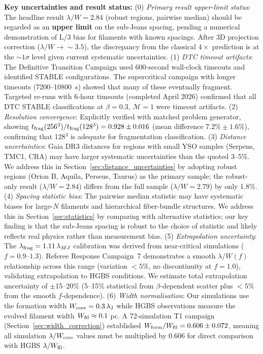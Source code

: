 \documentclass[twoside,twocolumn]{mnras}
\begin{document}
\textbf{Key uncertainties and result status:} (0) \textit{Primary result upper-limit status}: The headline result $\lambda/W = 2.84$ (robust regions, pairwise median) should be regarded as an \textbf{upper limit} on the sub-Jeans spacing, pending a numerical demonstration of L/3 bias for filaments with known spacings. After 3D projection correction ($\lambda/W \to \sim3.5$), the discrepancy from the classical $4\times$ prediction is at the $\sim1\sigma$ level given current systematic uncertainties. (1) \textit{DTC timeout artifacts}: The Definitive Transition Campaign used 600-second wall-clock timeouts and identified STABLE configurations. The supercritical campaign with longer timeouts (7200--10800~s) showed that many of these eventually fragment. Targeted re-runs with 6-hour timeouts (completed April 2026) confirmed that all DTC STABLE classifications at $\beta = 0.3$, $\mathcal{M} = 1$ were timeout artifacts. (2) \textit{Resolution convergence}: Explicitly verified with matched problem generator, showing $t_{\rm frag}(256^3)/t_{\rm frag}(128^3) = 0.928 \pm 0.016$ (mean difference $7.2\% \pm 1.6\%$), confirming that 128$^3$ is adequate for fragmentation classification. (3) \textit{Distance uncertainties}: Gaia DR3 distances for regions with small YSO samples (Serpens, TMC1, CRA) may have larger systematic uncertainties than the quoted 3--5\%. We address this in Section~\ref{sec:distance_uncertainties} by adopting robust regions (Orion B, Aquila, Perseus, Taurus) as the primary sample; the robust-only result ($\lambda/W = 2.84$) differs from the full sample ($\lambda/W = 2.79$) by only 1.8\%. (4) \textit{Spacing statistic bias}: The pairwise median statistic may have systematic biases for large-$N$ filaments and hierarchical fiber-bundle structures. We address this in Section~\ref{sec:statistics} by comparing with alternative statistics; our key finding is that the sub-Jeans spacing is robust to the choice of statistic and likely reflects real physics rather than measurement bias. (5) \textit{Extrapolation uncertainty}: The $\lambda_{\rm frag} = 1.11\,\lambda_{MJ}$ calibration was derived from near-critical simulations ($f = 0.9$--$1.3$). Referee Response Campaign~7 demonstrates a smooth $\lambda/W(f)$ relationship across this range (variation $<5\%$, no discontinuity at $f = 1.0$), validating extrapolation to HGBS conditions. We estimate total extrapolation uncertainty of $\pm$15--20\% (5--15\% statistical from $\beta$-dependent scatter plus $<5\%$ from the smooth $f$-dependence). (6) \textit{Width normalisation}: Our simulations use the formation width $W_{\rm core} = 0.3\,\lambda_{\rm J}$ while HGBS observations measure the evolved filament width $W_{\rm fil} \approx 0.1$ pc. A 72-simulation T1 campaign (Section~\ref{sec:width_correction}) established $W_{\rm form}/W_{\rm fil} = 0.606 \pm 0.072$, meaning all simulation $\lambda/W_{\rm core}$ values must be multiplied by 0.606 for direct comparison with HGBS $\lambda/W_{\rm fil}$.
\end{document}

